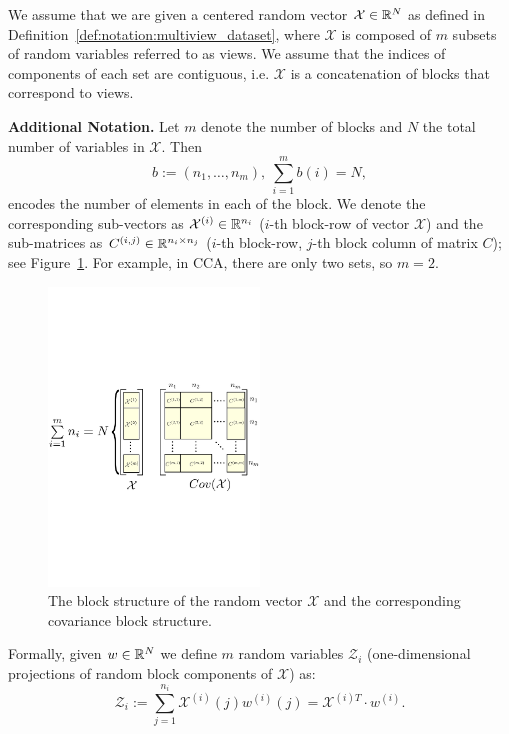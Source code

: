 We assume that we are given a centered random vector $\mathcal{X} \in \mathbb{R}^N$ as defined in Definition~\ref{def:notation:multiview_dataset},
where $\mathcal{X}$ is composed of $m$ subsets of random variables referred to as views. We assume that the indices of components
of each set are contiguous, i.e. $\mathcal{X}$ is a concatenation of blocks that correspond to views.

\noindent\textbf{Additional Notation.}
Let $m$ denote the number of blocks and $N$ the total number of
variables in $\mathcal{X}$. Then
$$b := \left(n_1, \ldots, n_m\right),~\sum_{i=1}^m b\left(i\right) = N,$$
encodes the number of elements in each of the block. We denote the corresponding
sub-vectors as $\mathcal{X}^{(i)} \in \mathbb{R}^{n_i}$
($i$-th block-row of vector $\mathcal{X}$) and the sub-matrices as $C^{(i,j)} \in \mathbb{R}^{n_i \times n_j}$
($i$-th block-row, $j$-th block column of matrix $C$); see Figure~\ref{fig:block_structure}.
For example, in CCA, there are only two sets, so $m=2$.
\begin{figure}[t]
\centering
\includegraphics[width=0.5\textwidth]{figures/block_structure.pdf}
\caption[The block structure]{The block structure of the  random vector $\mathcal{X}$ and the corresponding covariance block structure.}
\label{fig:block_structure}
\end{figure}

Formally, given $w \in \mathbb{R}^N$ we define $m$ random variables $\mathcal{Z}_i$ (one-dimensional
projections of random block components of $\mathcal{X}$) as:
\begin{equation*}
\mathcal{Z}_i := \sum_{j = 1}^{n_i} \mathcal{X}^{(i)}\left(j\right)
w^{(i)}\left(j\right) = \mathcal{X}^{(i)T} \cdot w^{(i)}.
\end{equation*}

